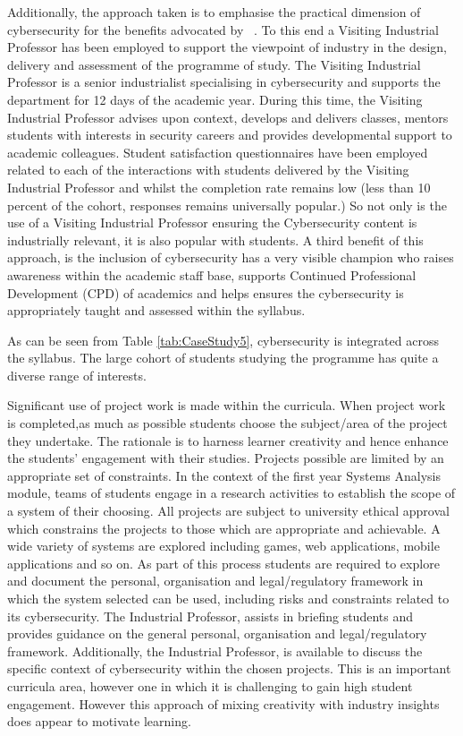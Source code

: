 \documentclass[conference]{IEEEtran}
\begin{document}
Additionally, the approach taken is to emphasise the practical dimension of cybersecurity for the benefits advocated by ~\cite{Weiss:2013:THC:2527148.2527180}. To this end a Visiting Industrial Professor has been employed to support the viewpoint of industry in the design, delivery and assessment of the programme of study. The Visiting Industrial Professor is a senior industrialist specialising in cybersecurity and supports the department for 12 days of the academic year. During this time, the Visiting Industrial Professor advises upon context, develops and delivers classes, mentors students with interests in security careers and provides developmental support to academic colleagues. Student satisfaction questionnaires have been employed related to each of the interactions with students delivered by the Visiting Industrial Professor and whilst the completion rate remains low (less than 10 percent of the cohort, responses remains universally popular.) So not only is the use of a Visiting Industrial Professor ensuring the Cybersecurity content is industrially relevant, it is also popular with students. A third benefit of this approach, is the inclusion of cybersecurity has a very visible champion who raises awareness within the academic staff base, supports Continued Professional Development (CPD) of academics and helps ensures the cybersecurity is appropriately taught and assessed within the syllabus.

As can be seen from Table {\ref{tab:CaseStudy5}}, cybersecurity is integrated across the syllabus. The  large cohort of students studying the programme has quite a diverse range of interests. 

 

Significant use of project work is made within the curricula. When project work is completed,as much as possible students choose the subject/area of the project they undertake. The rationale is to harness learner creativity {\cite{Bradley2020}} and hence enhance the students' engagement with their studies. Projects possible are limited by an appropriate set of constraints. In the context of the first year Systems Analysis module, teams of students engage in a research activities  to establish the scope of a system of their choosing. All projects are subject to university ethical approval which constrains the projects to those which are appropriate and achievable. A wide variety of systems are explored including games, web applications, mobile applications and so on. As part of this process students are required to explore and document the personal, organisation and legal/regulatory framework in which the system selected can be used, including risks and constraints related to its cybersecurity. The Industrial Professor, assists in briefing students and provides guidance on the general personal, organisation and legal/regulatory framework. Additionally, the Industrial Professor, is available to discuss the specific context of cybersecurity within the chosen projects. This is an important curricula area, however one in which it is challenging to gain high student engagement. However this approach of mixing creativity with industry insights does appear to motivate learning. 
\end{document}
